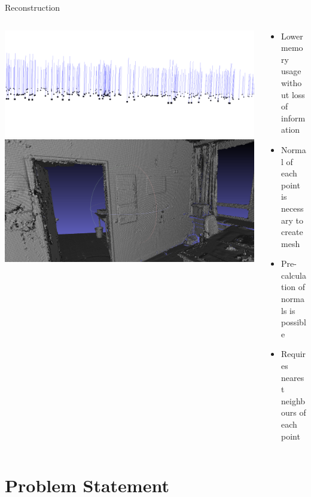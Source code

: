 \documentclass{beamer}
\begin{document}
\begin{frame}{Reconstruction}
	\begin{columns}
		\begin{column}{0.5\textwidth}
			\includegraphics[width=1.0\textwidth]{normals.png}
			\vspace{0.1cm}
			\includegraphics[width=1.0\textwidth]{police_mesh.png}
		\end{column}
		\begin{column}{0.5\textwidth}
			\begin{itemize}
				\item Lower memory usage without loss of information
				\item Normal of each point is necessary to create mesh
				\item Pre-calculation of normals is possible
				\item Requires nearest neighbours of each point
			\end{itemize}
		\end{column}
	\end{columns}
\end{frame}

\section{Problem Statement}
\end{document}
